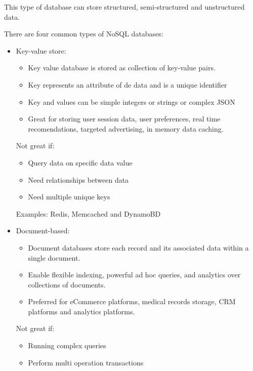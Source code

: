 \documentclass[../../ibm_data_analysis.tex]{subfiles}
\begin{document}
    This type of database can store structured, semi-structured and unstructured data.
    
    There are four common types of NoSQL databases: 
    \begin{itemize}
        \item Key-value store:
        \begin{itemize}
            \item Key value database is stored as collection of key-value pairs.
            \item Key represents an attribute of de data and is a unique identifier 
            \item Key and values can be simple integers or strings or complex JSON
            \item Great for storing user session data, user preferences, real time recomendations, targeted advertising, in memory data caching.
        \end{itemize}

        Not great if:
        \begin{itemize}
            \item Query data on specific data value
            \item Need relationships between data
            \item Need multiple unique keys
        \end{itemize}

        Examples: Redis, Memcached and DynamoBD

        \item Document-based:
        \begin{itemize}
            \item Document databases store each record and its associated data within a single document.
            \item Enable flexible indexing, powerful ad hoc queries, and analytics over collections of documents.
            \item Preferred for eCommerce platforms, medical records storage, CRM platforms and analytics platforms. 
        \end{itemize}

         Not great if:
        \begin{itemize}
            \item Running complex queries
            \item Perform multi operation transactions
        \end{itemize}


\end{itemize}
\end{document}
